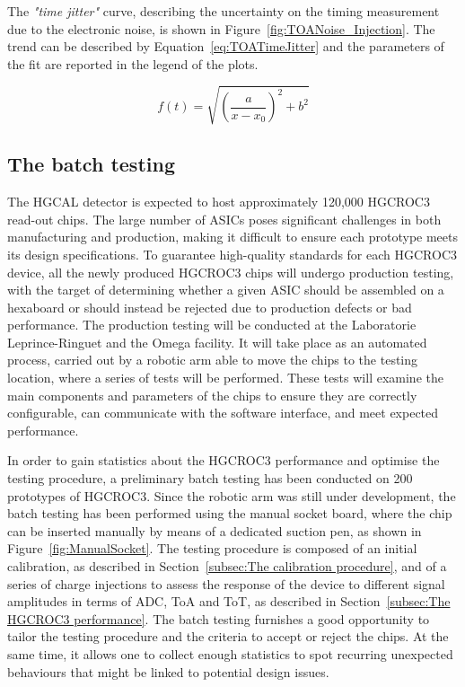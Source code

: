 The \textit{"time jitter"} curve, describing the uncertainty on the timing measurement due to the electronic noise, is shown in Figure~\ref{fig:TOANoise_Injection}.
The trend can be described by Equation~\ref{eq:TOATimeJitter} and the parameters of the fit are reported in the legend of the plots.

\begin{equation}
    f(t) = \sqrt{\left(\frac{a}{x-x_0}\right)^2+b^2}
\label{eq:TOATimeJitter}
\end{equation}

\subsection{The batch testing}
\label{subsec:The HGCROC3 batch testing}

The HGCAL detector is expected to host approximately 120,000 HGCROC3 read-out chips. The large number of ASICs poses significant challenges in both manufacturing and production, making it difficult to ensure each prototype meets its design specifications.
To guarantee high-quality standards for each HGCROC3 device, all the newly produced HGCROC3 chips will undergo production testing, with the target of determining whether a given ASIC should be assembled on a hexaboard or should instead be rejected due to production defects or bad performance.
The production testing will be conducted at the Laboratorie Leprince-Ringuet and the Omega facility. 
It will take place as an automated process, carried out by a robotic arm able to move the chips to the testing location, where a series of tests will be performed. 
These tests will examine the main components and parameters of the chips to ensure they are correctly configurable, can communicate with the software interface, and meet expected performance.

\bigbreak

In order to gain statistics about the HGCROC3 performance and optimise the testing procedure, a preliminary batch testing has been conducted on 200 prototypes of HGCROC3. Since the robotic arm was still under development, the batch testing has been performed using the manual socket board, where the chip can be inserted manually by means of a dedicated suction pen, as shown in Figure~\ref{fig:ManualSocket}.
The testing procedure is composed of an initial calibration, as described in Section~\ref{subsec:The calibration procedure}, and of a series of charge injections to assess the response of the device to different signal amplitudes in terms of ADC, ToA and ToT, as described in Section~\ref{subsec:The HGCROC3 performance}.
The batch testing furnishes a good opportunity to tailor the testing procedure and the criteria to accept or reject the chips. At the same time, it allows one to collect enough statistics to spot recurring unexpected behaviours that might be linked to potential design issues.


